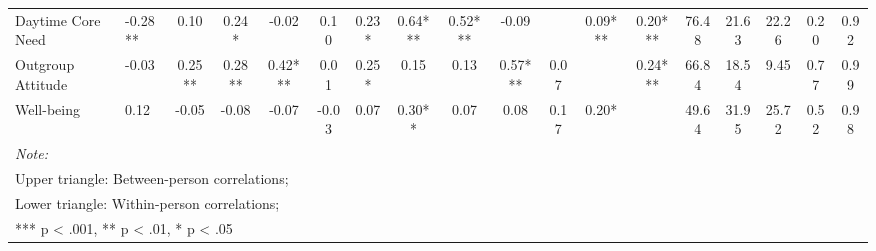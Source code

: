 \begin{sidewaystable}
{\begin{tabular}[t]{llcccccccccccccccc}
Daytime Core Need & -0.28** & 0.10 & 0.24* & -0.02 & 0.10 & 0.23* & 0.64*** & 0.52*** & -0.09 &  & 0.09*** & 0.20*** & 76.48 & 21.63 & 22.26 & 0.20 & 0.92\\
\addlinespace
Outgroup Attitude & -0.03 & 0.25** & 0.28** & 0.42*** & 0.01 & 0.25* & 0.15 & 0.13 & 0.57*** & 0.07 &  & 0.24*** & 66.84 & 18.54 & 9.45 & 0.77 & 0.99\\
Well-being & 0.12 & -0.05 & -0.08 & -0.07 & -0.03 & 0.07 & 0.30** & 0.07 & 0.08 & 0.17 & 0.20* &  & 49.64 & 31.95 & 25.72 & 0.52 & 0.98\\
\bottomrule
\multicolumn{18}{l}{\rule{0pt}{1em}\textit{Note: }}\\
\multicolumn{18}{l}{\rule{0pt}{1em}Upper triangle: Between-person correlations;}\\
\multicolumn{18}{l}{\rule{0pt}{1em}Lower triangle: Within-person correlations;}\\
\multicolumn{18}{l}{\rule{0pt}{1em}*** p < .001, ** p < .01,  * p < .05}\\
\end{tabular}}
\end{sidewaystable}
